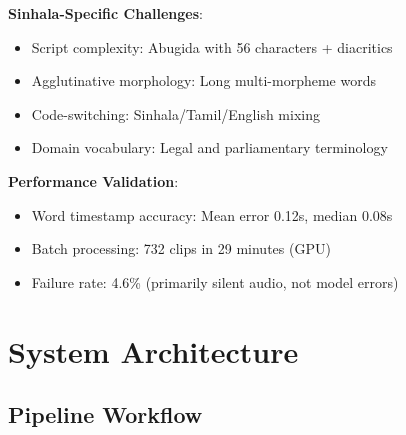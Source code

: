 \documentclass[11pt,a4paper]{article}
\begin{document}
\textbf{Sinhala-Specific Challenges}:
\begin{itemize}
    \item Script complexity: Abugida with 56 characters + diacritics
    \item Agglutinative morphology: Long multi-morpheme words
    \item Code-switching: Sinhala/Tamil/English mixing
    \item Domain vocabulary: Legal and parliamentary terminology
\end{itemize}

\textbf{Performance Validation}:
\begin{itemize}
    \item Word timestamp accuracy: Mean error 0.12s, median 0.08s
    \item Batch processing: 732 clips in 29 minutes (GPU)
    \item Failure rate: 4.6\% (primarily silent audio, not model errors)
\end{itemize}

\section{System Architecture}

\subsection{Pipeline Workflow}
\end{document}
